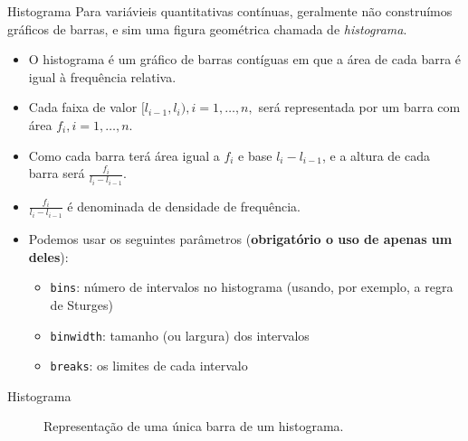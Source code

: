 \documentclass[
  10pt,
  ignorenonframetext,
]{beamer}
\providecommand{\tightlist}{%
  \setlength{\itemsep}{0pt}\setlength{\parskip}{0pt}}
\begin{document}
\begin{frame}[fragile]{Histograma}
\protect\hypertarget{histograma}{}
Para variávieis quantitativas contínuas, geralmente não construímos
gráficos de barras, e sim uma figura geométrica chamada de
\emph{histograma}.

\begin{itemize}
\tightlist
\item
  O histograma é um gráfico de barras contíguas em que a área de cada
  barra é igual à frequência relativa.
\item
  Cada faixa de valor \([l_{i-1}, l_{i}), i=1, \dots, n,\) será
  representada por um barra com área \(f_i, i=1, \dots, n\).
\item
  Como cada barra terá área igual a \(f_i\) e base \(l_i - l_{i-1}\), e
  a altura de cada barra será \(\frac{f_i}{l_i - l_{i-1}}\).
\item
  \(\frac{f_i}{l_i - l_{i-1}}\) é denominada de densidade de frequência.
\item
  Podemos usar os seguintes parâmetros (\textbf{obrigatório o uso de
  apenas um deles}):

  \begin{itemize}
  \tightlist
  \item
    \texttt{bins}: número de intervalos no histograma (usando, por
    exemplo, a regra de Sturges)
  \item
    \texttt{binwidth}: tamanho (ou largura) dos intervalos
  \item
    \texttt{breaks}: os limites de cada intervalo
  \end{itemize}
\end{itemize}
\end{frame}

\begin{frame}{Histograma}
\protect\hypertarget{histograma-1}{}
\begin{figure}
\centering
\caption{Representação de uma única barra de um histograma.}
\end{figure}
\end{frame}
\end{document}
